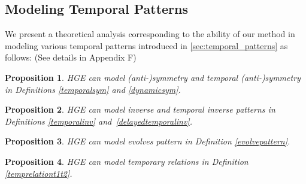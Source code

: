 \documentclass[letterpaper]{article} %
\newtheorem{theorem}{Theorem}
\newtheorem{proposition}{Proposition}
\begin{document}
\subsection{Modeling Temporal Patterns}
We present a theoretical analysis corresponding to the ability of our method in modeling various temporal patterns introduced in \ref{sec:temporal_patterns} as follows: (See details in Appendix F)
\begin{proposition}
HGE can model (anti-)symmetry and temporal (anti-)symmetry in Definitions \ref{temporalsym} and \ref{dynamicsym}.
\label{th1:tempsym}
\end{proposition}

\begin{proposition}
HGE can model inverse and temporal inverse patterns in Definitions \ref{temporalinv} and~\ref{delayedtemporalinv}.
\label{th1:tempinv}
\end{proposition}

\begin{proposition}
HGE can model evolves pattern in Definition \ref{evolvepattern}.
\label{th1:tempevolv}
\end{proposition}

\begin{proposition}
HGE can model temporary relations in Definition \ref{temprelationt1t2}.
\label{th1:tempevolv}
\end{proposition}







\end{document}
